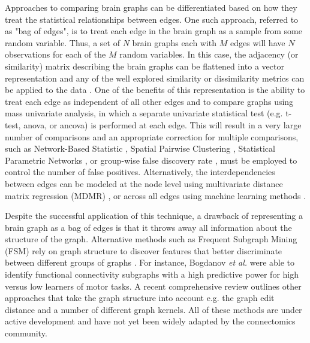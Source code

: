 \documentclass{bmcart}
\begin{document}
Approaches to comparing brain graphs can be differentiated based on how they treat the statistical relationships between edges. One such approach, referred to as "bag of edges", is to treat each edge in the brain graph as a sample from some random variable. Thus, a set of $N$ brain graphs each with $M$ edges will have $N$ observations for each of the $M$ random variables. In this case, the adjacency (or similarity) matrix describing the brain graphs can be flattened into a vector representation and any of the well explored similarity or dissimilarity metrics can be applied to the data \cite{Craddock2013}. One of the benefits of this representation is the ability to treat each edge as independent of all other edges and to compare graphs using mass univariate analysis, in which a separate univariate statistical test (e.g. t-test, anova, or ancova) is performed at each edge. This will result in a very large number of comparisons and an appropriate correction for multiple comparisons, such as Network-Based Statistic \cite{Zalesky2012}, Spatial Pairwise Clustering \cite{Zalesky2012}, Statistical Parametric Networks \cite{Ginestat2011}, or group-wise false discovery rate  \cite{Benjamini2001}, must be employed to control the number of false positives. Alternatively, the interdependencies between edges can be modeled at the node level using multivariate distance matrix regression (MDMR) \cite{Shehzad2014}, or across all edges using machine learning methods \cite{Craddock2009, Dosenbach2010, Richiardi2011}.

Despite the successful application of this technique, a drawback of representing a brain graph as a bag of edges is that it throws away all information about the structure of the graph. Alternative methods such as Frequent Subgraph Mining (FSM) rely on graph structure to discover features that better discriminate between different groups of graphs \cite{Thoma2010}. For instance, Bogdanov \emph{et al.} \cite{Bogdanov2014} were able to identify functional connectivity subgraphs with a high predictive power for high versus low learners of motor tasks. A recent comprehensive review \cite{Richiardi2013} outlines other approaches that take the graph structure into account e.g. the graph edit distance and a number of different graph kernels. All of these methods are under active development and have not yet been widely adapted by the connectomics community.
\end{document}

